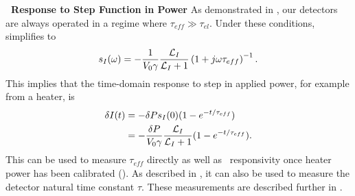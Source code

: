 \textbf{\TES\ Response to Step Function in Power}
As demonstrated in , our detectors are always operated in a regime where $\tau_{eff} \gg \tau_{el}$.
Under these conditions,  simplifies to
\begin{equation} \label{eqn:htr-step-resp-high}
s_I(\omega) = - \frac{1}{V_0 \gamma}\frac{\mathcal{L}_I}{\mathcal{L}_I + 1}
                       \left(1 + j \omega \tau_{eff}\right)^{-1}.
\end{equation}
This implies that the time-domain response to step in applied power, for example from a heater, is
\begin{align} \label{eqn:htr-step-resp-high-time}
    \delta I(t) & = - \delta P s_I(0) (1 - e^{-t/\tau_{eff}}) \\
                & = - \frac{\delta P}{V_0 \gamma}\frac{\mathcal{L}_I}{\mathcal{L}_I + 1}
                      (1 - e^{-t/\tau_{eff}}).
\end{align}
This can be used to measure $\tau_{eff}$ directly as well as \DC\ responsivity once heater power has been calibrated ().
As described in , it can also be used to measure the detector natural time constant $\tau$.
These measurements are described further in .

